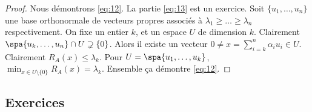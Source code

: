 \begin{proof}
Nous démontrons \eqref{eq:12}. La partie \eqref{eq:13} est un exercice. Soit $\{u_1,\dots,u_n\}$ une base orthonormale de vecteurs propres associés à $\lambda_1 ≥ \dots ≥ \lambda_n$ respectivement. On fixe un entier $k$, et un espace $U$ de dimension $k$. Clairement $\spa\{u_k,\dots,u_n\} \cap U \supsetneq \{0\}$. Alors il existe un vecteur $0 \neq x = \sum_{i = k}^n \alpha_i u_i \in U$. Clairement $R_A(x) \leq \lambda_k$. Pour $U = \spa\{u_1,\dots,u_k\}$, 
$
  \min_{x \in U \setminus \{0\}}  R_A(x) = \lambda_k.
$ Ensemble ça démontre \eqref{eq:12}. 
\end{proof}



\subsection*{Exercices}

